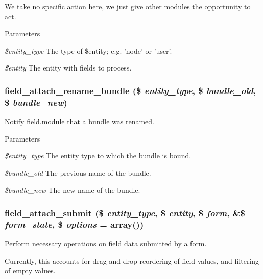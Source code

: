 We take no specific action here, we just give other modules the opportunity to act.


\begin{DoxyParams}{Parameters}
\item[{\em \$entity\_\-type}]The type of \$entity; e.g. 'node' or 'user'. \item[{\em \$entity}]The entity with fields to process. \end{DoxyParams}
\hypertarget{group__field__attach_ga25bffa83f84504c834d27b2126f58f51}{
\subsubsection[{field\_\-attach\_\-rename\_\-bundle}]{\setlength{\rightskip}{0pt plus 5cm}field\_\-attach\_\-rename\_\-bundle (\$ {\em entity\_\-type}, \/  \$ {\em bundle\_\-old}, \/  \$ {\em bundle\_\-new})}}
\label{group__field__attach_ga25bffa83f84504c834d27b2126f58f51}
Notify \hyperlink{field_8module}{field.module} that a bundle was renamed.


\begin{DoxyParams}{Parameters}
\item[{\em \$entity\_\-type}]The entity type to which the bundle is bound. \item[{\em \$bundle\_\-old}]The previous name of the bundle. \item[{\em \$bundle\_\-new}]The new name of the bundle. \end{DoxyParams}
\hypertarget{group__field__attach_ga756e59f651aa870ee79dd488b4e799c8}{
\subsubsection[{field\_\-attach\_\-submit}]{\setlength{\rightskip}{0pt plus 5cm}field\_\-attach\_\-submit (\$ {\em entity\_\-type}, \/  \$ {\em entity}, \/  \$ {\em form}, \/  \&\$ {\em form\_\-state}, \/  \$ {\em options} = {\ttfamily array()})}}
\label{group__field__attach_ga756e59f651aa870ee79dd488b4e799c8}
Perform necessary operations on field data submitted by a form.

Currently, this accounts for drag-\/and-\/drop reordering of field values, and filtering of empty values.


